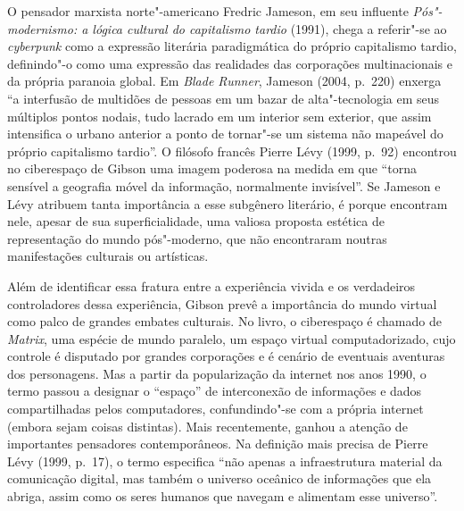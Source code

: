 O pensador marxista norte"-americano Fredric Jameson, em seu influente
\emph{Pós"-modernismo: a lógica cultural do capitalismo tardio} (1991),
chega a referir"-se ao \emph{cyberpunk} como a expressão literária
paradigmática do próprio capitalismo tardio, definindo"-o como uma
expressão das realidades das corporações multinacionais e da própria
paranoia global. Em \emph{Blade Runner}, Jameson (2004, p.~220) enxerga
``a interfusão de multidões de pessoas em um bazar de alta"-tecnologia em
seus múltiplos pontos nodais, tudo lacrado em um interior sem exterior,
que assim intensifica o urbano anterior a ponto de tornar"-se um sistema
não mapeável do próprio capitalismo tardio''. O filósofo francês Pierre
Lévy (1999, p.~92) encontrou no ciberespaço de Gibson uma imagem
poderosa na medida em que ``torna sensível a geografia móvel da
informação, normalmente invisível''. Se Jameson e Lévy atribuem tanta
importância a esse subgênero literário, é porque encontram nele, apesar
de sua superficialidade, uma valiosa proposta estética de representação
do mundo pós"-moderno, que não encontraram noutras manifestações
culturais ou artísticas.

Além de identificar essa fratura entre a experiência vivida e os
verdadeiros controladores dessa experiência, Gibson prevê a importância
do mundo virtual como palco de grandes embates culturais. No livro, o
ciberespaço é chamado de \emph{Matrix}, uma espécie de mundo paralelo,
um espaço virtual computadorizado, cujo controle é disputado por grandes
corporações e é cenário de eventuais aventuras dos personagens. Mas a
partir da popularização da internet nos anos 1990, o termo passou a
designar o ``espaço'' de interconexão de informações e dados
compartilhadas pelos computadores, confundindo"-se com a própria internet
(embora sejam coisas distintas). Mais recentemente, ganhou a atenção de
importantes pensadores contemporâneos. Na definição mais precisa de
Pierre Lévy (1999, p.~17), o termo especifica ``não apenas a
infraestrutura material da comunicação digital, mas também o universo
oceânico de informações que ela abriga, assim como os seres humanos que
navegam e alimentam esse universo''.


